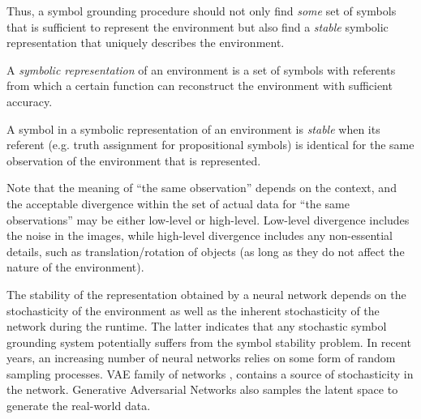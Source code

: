 

Thus, a symbol grounding procedure should not only find \emph{some} set of symbols that is sufficient to represent the
environment but also find a \emph{stable} symbolic representation that uniquely describes the environment.

\begin{defi}
A \emph{symbolic representation} of an environment is a set of symbols with referents
from which a certain function can reconstruct the environment with sufficient accuracy.
\end{defi}

\begin{defi}
A symbol in a symbolic representation of an environment is \emph{stable}
when its referent (e.g. truth assignment for propositional symbols) is identical
for the same observation of the environment that is represented.
\end{defi}

Note that the meaning of ``the same observation'' depends on the context,
and the acceptable divergence within the set of actual data for ``the same observations'' may be either low-level or high-level.
Low-level divergence includes the noise in the images, while high-level divergence includes any non-essential details,
such as translation/rotation of objects (as long as they do not affect the nature of the environment).





The stability of the representation obtained by a neural network depends
on the stochasticity of the environment as well as
the inherent stochasticity of the network during the runtime.
% 
The latter indicates that any stochastic symbol grounding system potentially suffers from 
the symbol stability problem.
% 
In recent years,
an increasing number of neural networks relies on some form of random
sampling processes.  VAE family of networks
\cite{kingma2013auto,jang2016categorical,higgins2016beta},
contains a source of stochasticity in the network. Generative
Adversarial Networks \cite[GAN]{goodfellow2014generative} also samples
the latent space to generate the real-world data.

